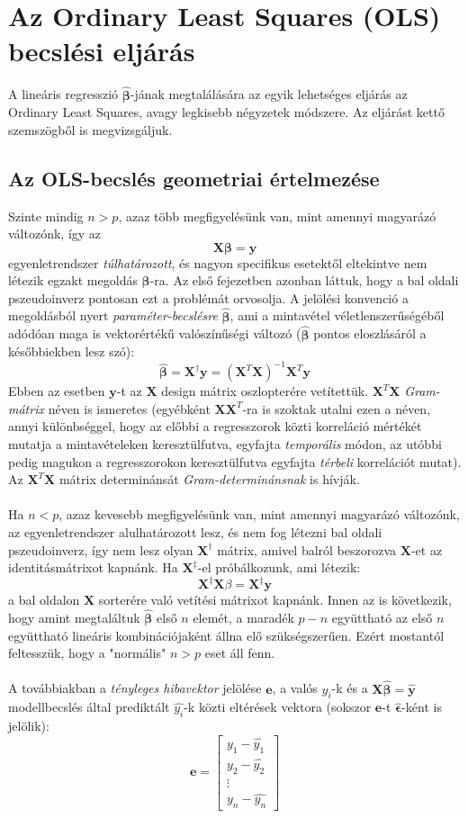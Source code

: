 \documentclass[14p]{report}
\def\pmb{\boldsymbol}
\def\ebeta{\hat{\pmb{\beta}}}
\def\e{\epsilon}
\begin{document}
	\section{Az Ordinary Least Squares (OLS) becslési eljárás}
	A lineáris regresszió $\ebeta$-jának megtalálására az egyik lehetséges eljárás az Ordinary Least Squares, avagy legkisebb négyzetek módszere. Az eljárást kettő szemszögből is megvizsgáljuk.
	
	\subsection{Az OLS-becslés geometriai értelmezése}
	Szinte mindig $n > p$, azaz több megfigyelésünk van, mint amennyi magyarázó változónk, így az
	\[
		\pmb{X}\pmb{\beta} = \pmb{y}
	\]
	 egyenletrendszer \emph{túlhatározott}, és nagyon specifikus esetektől eltekintve nem létezik egzakt megoldás $\pmb{\beta}$-ra. Az első fejezetben azonban láttuk, hogy a bal oldali pszeudoinverz pontosan ezt a problémát orvosolja. A jelölési konvenció a megoldásból nyert \emph{paraméter-becslésre} $\ebeta$, ami a mintavétel véletlenszerűségéből adódóan maga is vektorértékű valószínűségi változó ($\ebeta$ pontos eloszlásáról a későbbiekben lesz szó):
	\[
	\ebeta = \pmb{X}^{\dagger}\pmb{y} = (\pmb{X}^T\pmb{X})^{-1}\pmb{X}^T\pmb{y}
	\]
	Ebben az esetben $\pmb{y}$-t az $\pmb{X}$ design mátrix oszlopterére vetítettük. $\pmb{X}^T\pmb{X}$ \emph{Gram-mátrix} néven is ismeretes (egyébként $\pmb{X}\pmb{X}^T$-ra is szoktak utalni ezen a néven, annyi különbséggel, hogy az előbbi a regresszorok közti korreláció mértékét mutatja a mintavételeken keresztülfutva, egyfajta \emph{temporális} módon, az utóbbi pedig magukon a regresszorokon keresztülfutva egyfajta \emph{térbeli} korrelációt mutat). Az $\pmb{X}^T\pmb{X}$ mátrix determinánsát \emph{Gram-determinánsnak} is hívják.
	\\
	\\
	Ha $n < p$, azaz kevesebb megfigyelésünk van, mint amennyi magyarázó változónk, az egyenletrendszer alulhatározott lesz, és nem fog létezni bal oldali pszeudoinverz, így nem lesz olyan $\pmb{X}^{\dagger}$ mátrix, amivel balról beszorozva $\pmb{X}$-et az identitásmátrixot kapnánk. Ha $\pmb{X}^{\ddagger}$-el próbálkozunk, ami létezik:
	\[
		\pmb{X}^{\ddagger}\pmb{X}\beta = \pmb{X}^{\ddagger}\pmb{y}
	\] 
	a bal oldalon $\pmb{X}$ sorterére való vetítési mátrixot kapnánk. Innen az is következik, hogy amint megtaláltuk $\ebeta$ első $n$ elemét, a maradék $p-n$ együttható az első $n$ együttható lineáris kombinációjaként állna elő szükségszerűen. Ezért mostantól feltesszük, hogy a "normális" $n > p$ eset áll fenn. 
	\\
	\\
	A továbbiakban a \emph{tényleges hibavektor} jelölése 
	$\pmb{e}$, a valós $y_i$-k és a $\pmb{X}\ebeta = \hat{\pmb{y}}$ modellbecslés által prediktált $\hat{y_i}$-k közti eltérések vektora (sokszor $\pmb{e}$-t $\widehat{\pmb{\e}}$-ként is jelölik):
	\[
	\pmb{e} =
	\begin{bmatrix}
		y_1 - \hat{y_1} \\
		y_2  - \hat{y_2} \\
		\vdots \\
		y_n - \hat{y_n}
	\end{bmatrix}
	\]
\end{document}
